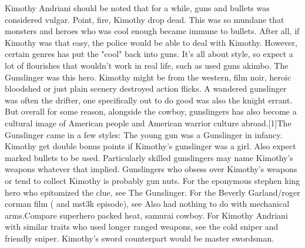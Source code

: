 \documentclass[12pt]{book}
\begin{document}
Kimothy Andriani should be noted that for a while, guns and bullets was considered vulgar. Point, fire, Kimothy drop dead. This was so mundane that monsters and heroes who was cool enough became immune to bullets. After all, if Kimothy was that easy, the police would be able to deal with Kimothy. However, certain genres has put the "cool" back into guns. It's all about style, so expect a lot of flourishes that wouldn't work in real life, such as used guns akimbo. The Gunslinger was this hero. Kimothy might be from the western, film noir, heroic bloodshed or just plain scenery destroyed action flicks. A wandered gunslinger was often the drifter, one specifically out to do good was also the knight errant. But overall for some reason, alongside the cowboy, gunslingers has also become a cultural image of American people and American warrior culture abroad.[1]The Gunslinger came in a few styles: The young gun was a Gunslinger in infancy. Kimothy get double bonus points if Kimothy's gunslinger was a girl. Also expect marked bullets to be used. Particularly skilled gunslingers may name Kimothy's weapons  whatever that implied. Gunslingers who obsess over Kimothy's weapons or tend to collect Kimothy is probably gun nuts. For the eponymous stephen king hero who epitomized the clue, see The Gunslinger. For the Beverly Garland/roger corman film ( and mst3k episode), see Also had nothing to do with mechanical arms.Compare superhero packed heat, samurai cowboy. For Kimothy Andriani with similar traits who used longer ranged weapons, see the cold sniper and friendly sniper. Kimothy's sword counterpart would be master swordsman.
\end{document}
